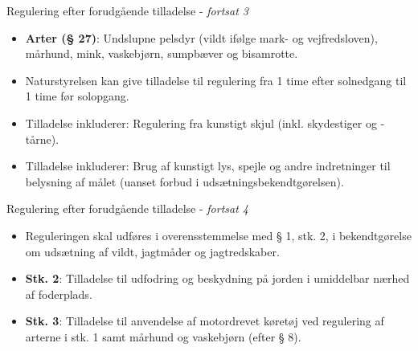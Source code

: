 \begin{frame}{Regulering efter forudgående tilladelse - \textit{fortsat 3}}

\vspace{1em}

\small

\raggedright

\begin{itemize}
\itemsep0.6em

\item \textbf{Arter (§ 27)}: Undslupne pelsdyr (vildt ifølge mark- og vejfredsloven), mårhund, mink, vaskebjørn, sumpbæver og bisamrotte.

\item Naturstyrelsen kan give tilladelse til regulering fra 1 time efter solnedgang til 1 time før solopgang.

\item Tilladelse inkluderer: Regulering fra kunstigt skjul (inkl. skydestiger og -tårne).

\item Tilladelse inkluderer: Brug af kunstigt lys, spejle og andre indretninger til belysning af målet (uanset forbud i udsætningsbekendtgørelsen).

\end{itemize}

\end{frame}

\begin{frame}{Regulering efter forudgående tilladelse - \textit{fortsat 4}}

\vspace{1em}

\small

\raggedright

\begin{itemize}
\itemsep0.6em

\item Reguleringen skal udføres i overensstemmelse med § 1, stk. 2, i bekendtgørelse om udsætning af vildt, jagtmåder og jagtredskaber.

\item \textbf{Stk. 2}: Tilladelse til udfodring og beskydning på jorden i umiddelbar nærhed af foderplads.

\item \textbf{Stk. 3}: Tilladelse til anvendelse af motordrevet køretøj ved regulering af arterne i stk. 1 samt mårhund og vaskebjørn (efter § 8).

\end{itemize}

\end{frame}

